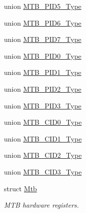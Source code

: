 \begin{DoxyCompactItemize}
\item 
union \hyperlink{union_m_t_b___p_i_d5___type}{M\+T\+B\+\_\+\+P\+I\+D5\+\_\+\+Type}
\item 
union \hyperlink{union_m_t_b___p_i_d6___type}{M\+T\+B\+\_\+\+P\+I\+D6\+\_\+\+Type}
\item 
union \hyperlink{union_m_t_b___p_i_d7___type}{M\+T\+B\+\_\+\+P\+I\+D7\+\_\+\+Type}
\item 
union \hyperlink{union_m_t_b___p_i_d0___type}{M\+T\+B\+\_\+\+P\+I\+D0\+\_\+\+Type}
\item 
union \hyperlink{union_m_t_b___p_i_d1___type}{M\+T\+B\+\_\+\+P\+I\+D1\+\_\+\+Type}
\item 
union \hyperlink{union_m_t_b___p_i_d2___type}{M\+T\+B\+\_\+\+P\+I\+D2\+\_\+\+Type}
\item 
union \hyperlink{union_m_t_b___p_i_d3___type}{M\+T\+B\+\_\+\+P\+I\+D3\+\_\+\+Type}
\item 
union \hyperlink{union_m_t_b___c_i_d0___type}{M\+T\+B\+\_\+\+C\+I\+D0\+\_\+\+Type}
\item 
union \hyperlink{union_m_t_b___c_i_d1___type}{M\+T\+B\+\_\+\+C\+I\+D1\+\_\+\+Type}
\item 
union \hyperlink{union_m_t_b___c_i_d2___type}{M\+T\+B\+\_\+\+C\+I\+D2\+\_\+\+Type}
\item 
union \hyperlink{union_m_t_b___c_i_d3___type}{M\+T\+B\+\_\+\+C\+I\+D3\+\_\+\+Type}
\item 
struct \hyperlink{struct_mtb}{Mtb}
\begin{DoxyCompactList}\small\item\em M\+T\+B hardware registers. \end{DoxyCompactList}\end{DoxyCompactItemize}

